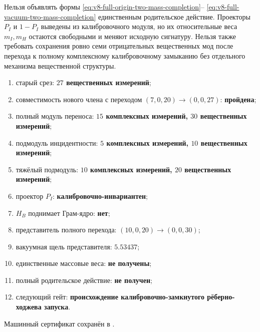 \begin{nogocriterion}
Нельзя объявлять формы \eqref{eq:v8-full-origin-two-mass-completion}--
\eqref{eq:v8-full-vacuum-two-mass-completion} единственным родительское действие.
Проекторы $P_I$ и $1-P_I$ выведены из калибровочного модуля, но их относительные
веса $m_I,m_H$ остаются свободными и меняют исходную сигнатуру. Нельзя также
требовать сохранения ровно семи отрицательных вещественных мод после перехода
к полному комплексному калибровочному замыканию без отдельного механизма вещественной структуры.
\end{nogocriterion}

\begin{protocol}
\begin{enumerate}
 \item старый срез: \textbf{$27$ вещественных измерений};
 \item совместимость нового члена с переходом $(7,0,20)\to(0,0,27)$:
 \textbf{пройдена};
 \item полный модуль переноса: \textbf{$15$ комплексных измерений, $30$ вещественных измерений};
 \item подмодуль инцидентности: \textbf{$5$ комплексных измерений, $10$ вещественных измерений};
 \item тяжёлый подмодуль: \textbf{$10$ комплексных измерений, $20$ вещественных измерений};
 \item проектор $P_I$: \textbf{калибровочно-инвариантен};
 \item $H_B$ поднимает Грам-ядро: \textbf{нет};
 \item представитель полного перехода: \textbf{$(10,0,20)\to(0,0,30)$};
 \item вакуумная щель представителя: \textbf{$5.53437$};
 \item единственные массовые веса: \textbf{не получены};
 \item полный родительское действие: \textbf{не получен};
 \item следующий гейт: \textbf{происхождение калибровочно-замкнутого рёберно-ходжева
 запуска}.
\end{enumerate}
\end{protocol}

Машинный сертификат сохранён в
.